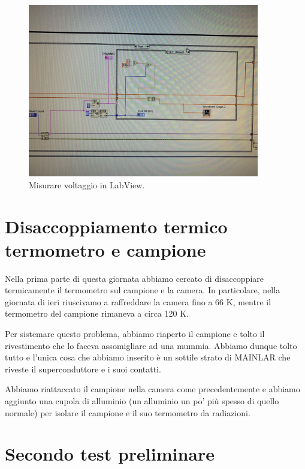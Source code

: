 \documentclass[../main/main.tex]{subfiles}
\begin{document}
\begin{figure}[h!]
\centering
\includegraphics[width=0.9\textwidth]{../lessons/image/14/2.jpg}
\caption{\label{fig:14_2} Misurare voltaggio in LabView.}
\end{figure}

\section{Disaccoppiamento termico termometro e campione}
Nella prima parte di questa giornata abbiamo cercato di disaccoppiare termicamente il termometro sul campione e la camera. In particolare, nella giornata di ieri riuscivamo a raffreddare la camera fino a 66 K, mentre il termometro del campione rimaneva a circa 120 K.

Per sistemare questo problema, abbiamo riaperto il campione e tolto il rivestimento che lo faceva assomigliare ad una mummia. Abbiamo dunque tolto tutto e l'unica cosa che abbiamo inserito è un sottile strato di MAINLAR che riveste il superconduttore e i suoi contatti.

Abbiamo riattaccato il campione nella camera come precedentemente e abbiamo aggiunto una cupola di alluminio (un alluminio un po' più spesso di quello normale) per isolare il campione e il suo termometro da radiazioni.



\section{Secondo test preliminare}
\end{document}
